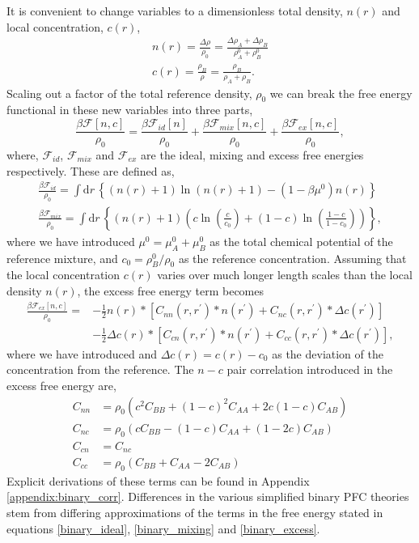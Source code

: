\documentclass[showkeys, prb, reprint]{revtex4-1}
\newcommand{\F}{\mathcal{F}}    %
\renewcommand{\l}{\left}        %
\renewcommand{\r}{\right}       %
\newcommand{\f}{\frac}          %
\newcommand{\A}{\rho_A}         %
\newcommand{\B}{\rho_B}         %
\begin{document}
It is convenient to change variables to a dimensionless total density, $n(r)$
and local concentration, $c(r)$,
%
\begin{gather}
    n(r) = \f{\Delta \rho}{\rho_0} = \f{\Delta\A + \Delta\B}{\A^0 + \B^0} \\
    c(r) = \f{\B}{\rho} = \f{\B}{\A + \B}.
\end{gather}
%
Scaling out a factor of the total reference density, $\rho_0$ we can break the
free energy functional in these new variables into three parts,
%
\begin{equation}
    \label{binary_total_free_energy}
    \f{\beta\F[n, c]}{\rho_0} = \f{\beta\F_{id}[n]}{\rho_0} 
        + \f{\beta\F_{mix}[n, c]}{\rho_0}
        + \f{\beta\F_{ex}[n, c]}{\rho_0},
\end{equation}
%
where, $\F_{id}$, $\F_{mix}$ and $\F_{ex}$ are the ideal, mixing and excess
free energies respectively. These are defined as,
%
\begin{gather}
    \label{binary_ideal}
    \f{\beta\F_{id}}{\rho_0} =
        \int \mathrm{d}r \,\l\lbrace (n(r) + 1)\ln(n(r) + 1) 
        - (1 - \beta\mu^0)n(r) \r\rbrace \\
    \label{binary_mixing}
    \f{\beta\F_{mix}}{\rho_0} =
        \int \mathrm{d}r \,\l\lbrace (n(r) + 1)\l( 
            c\ln\l(\f{c}{c_0}\r) + (1-c)\ln\l(\f{1-c}{1-c_0}\r) \r)\r\rbrace, 
\end{gather}
%
where we have introduced $\mu^0=\mu_A^0+\mu_B^0$ as the total chemical
potential of the reference mixture, and $c_0 = \B^0 / \rho_0$ as the reference
concentration. Assuming that the local concentration $c(r)$ varies over much
longer length scales than the local density $n(r)$, the excess free energy term
becomes  
%
\begin{align}
    \label{binary_excess}
    \f{\beta\F_{ex}[n, c]}{\rho_0}
        = &-\f{1}{2} n(r) \ast \l[ 
            C_{nn}(r, r^\prime) \ast n(r^\prime) 
          + C_{nc}(r, r^\prime) \ast \Delta c(r^\prime)\r] \\
        &-\f{1}{2} \Delta c(r) \ast \l[
            C_{cn}(r, r^\prime) \ast n(r^\prime) 
          + C_{cc}(r, r^\prime) \ast \Delta c(r^\prime)\r], \nonumber
\end{align}
%
where we have introduced  and $\Delta c(r) = c(r) - c_0$ as the deviation of the 
concentration from the reference.  The $n-c$ pair correlation introduced in the 
excess free energy are,
%
\begin{align}
    C_{nn} &= \rho_0\l(c^2 C_{BB} + (1 - c)^2C_{AA} + 2c(1-c)C_{AB}\r) \label{orig_nnC}\\
    C_{nc} &= \rho_0\l(c C_{BB} - (1 - c) C_{AA} + (1 - 2c)C_{AB}\r) \\
    C_{cn} &= C_{nc} \\
    C_{cc} &= \rho_0\l(C_{BB} + C_{AA} - 2 C_{AB}\r)
\end{align}
%
Explicit derivations of these terms can be found in Appendix \ref{appendix:binary_corr}.
Differences in the various simplified binary PFC theories stem from differing
approximations of the terms in the free energy stated in equations 
\ref{binary_ideal}, \ref{binary_mixing} and \ref{binary_excess}.
\end{document}
